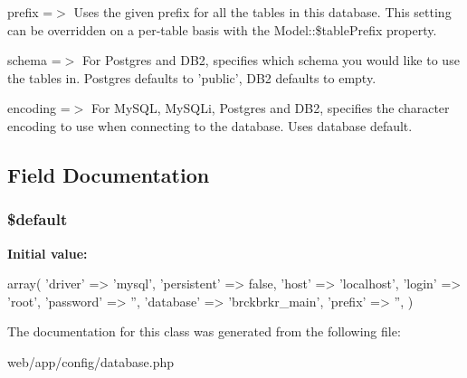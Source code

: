 prefix =$>$ Uses the given prefix for all the tables in this database. This setting can be overridden on a per-\/table basis with the Model::\$tablePrefix property.

schema =$>$ For Postgres and DB2, specifies which schema you would like to use the tables in. Postgres defaults to 'public', DB2 defaults to empty.

encoding =$>$ For MySQL, MySQLi, Postgres and DB2, specifies the character encoding to use when connecting to the database. Uses database default. 

\subsection{Field Documentation}
\hypertarget{class_d_a_t_a_b_a_s_e___c_o_n_f_i_g_a9df479534ecf05fd7575c6275d381687}{
\subsubsection[{\$default}]{\setlength{\rightskip}{0pt plus 5cm}\$default}}
\label{class_d_a_t_a_b_a_s_e___c_o_n_f_i_g_a9df479534ecf05fd7575c6275d381687}
{\bfseries Initial value:}
\begin{DoxyCode}
 array(
                'driver' => 'mysql',
                'persistent' => false,
                'host' => 'localhost',
                'login' => 'root',
                'password' => '',
                'database' => 'brckbrkr_main',
                'prefix' => '',
        )
\end{DoxyCode}


The documentation for this class was generated from the following file:\begin{DoxyCompactItemize}
\item 
web/app/config/database.php\end{DoxyCompactItemize}
